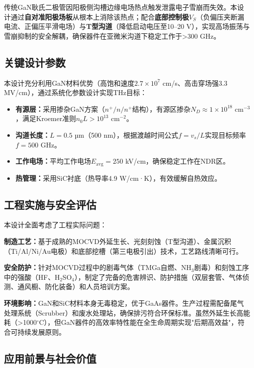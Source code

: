\documentclass[12pt,a4paper]{article}
\begin{document}
传统GaN耿氏二极管因阳极侧沟槽边缘电场热点触发泄露电子雪崩而失效。本设计通过\textbf{自对准阳极场板}从根本上消除该热点；配合\textbf{底部控制极$V_S$}（负偏压夹断漏电流、正偏压平滑电场）与\textbf{T型沟道}（降低启动电压至10--20 V），实现高场振荡与雪崩抑制的安全解耦，确保器件在亚微米沟道下稳定工作于>300 GHz。

\subsection{关键设计参数}

本设计充分利用GaN材料优势（高饱和速度$2.7 \times 10^7$ cm/s、高击穿场强3.3 MV/cm），通过系统化参数设计实现THz目标：

\begin{itemize}
    \item \textbf{有源层：}采用掺杂GaN方案（$n^+/n/n^+$结构），有源区掺杂$N_D \approx 1 \times 10^{18}$ cm$^{-3}$，满足Kroemer准则$n_0L > 10^{13}$ cm$^{-2}$。
    \item \textbf{沟道长度：}$L = 0.5$ µm（500 nm），根据渡越时间公式$f = v_s / L$实现目标频率$f = 500$ GHz。
    \item \textbf{工作电场：}平均工作电场$E_{\text{avg}} = 250$ kV/cm，确保稳定工作在NDR区。
    \item \textbf{热管理：}采用SiC衬底（热导率4.9 W/cm·K），有效缓解自热效应。
\end{itemize}

\subsection{工程实施与安全评估}

本设计全面考虑了工程实际问题：

\textbf{制造工艺：}基于成熟的MOCVD外延生长、光刻刻蚀（T型沟道）、金属沉积（Ti/Al/Ni/Au电极）和底部挖槽（第三电极引出）技术，工艺路线清晰可行。

\textbf{安全防护：}针对MOCVD过程中的剧毒气体（TMGa自燃、NH$_3$剧毒）和刻蚀工序中的强酸（HF、H$_2$SO$_4$），制定了完备的危害辨识、防护措施（双层套管、气体侦测、通风橱、防化装备）和人员培训方案。

\textbf{环境影响：}GaN和SiC材料本身无毒稳定，优于GaAs器件。生产过程需配备尾气处理系统（Scrubber）和废水处理站，确保排污符合环保标准。虽然外延生长高能耗（>1000$^{\circ}$C），但GaN器件的高效率特性能在全生命周期实现"后期高效益"，符合可持续发展原则。

\subsection{应用前景与社会价值}
\end{document}
